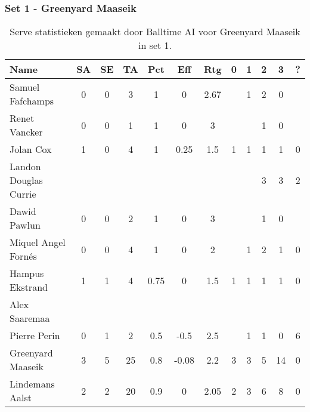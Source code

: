 \subsubsection{Set 1 - Greenyard Maaseik}
\label{sec:PL3_Greenyard1}

\begin{table}[ht!]
  \centering
  \scriptsize
  \begin{tabular}{|l|c|c|c|c|c|c|c|c|c|c|c|} \hline
    \textbf{Name} & SA & SE & TA & Pct & Eff & Rtg & 0 & 1 & 2 & 3 & ? \\ \hline
    Samuel Fafchamps & 0 & 0 & 3 & 1 & 0 & 2.67 &   & 1 & 2 & 0 &   \\
    Renet Vancker & 0 & 0 & 1 & 1 & 0 & 3 &   &   & 1 & 0 &   \\
    Jolan Cox & 1 & 0 & 4 & 1 & 0.25 & 1.5 & 1 & 1 & 1 & 1 & 0 \\
    Landon Douglas Currie &   &   &   &   &   &   &   &   & 3 & 3 & 2 \\
    Dawid Pawlun & 0 & 0 & 2 & 1 & 0 & 3 &   &   & 1 & 0 &   \\
    Miquel Angel Fornés & 0 & 0 & 4 & 1 & 0 & 2 &   & 1 & 2 & 1 & 0 \\
    Hampus Ekstrand & 1 & 1 & 4 & 0.75 & 0 & 1.5 & 1 & 1 & 1 & 1 & 0 \\
    Alex Saaremaa &   &   &   &   &   &   &   &   &   &   &   \\
    Pierre Perin & 0 & 1 & 2 & 0.5 & -0.5 & 2.5 &   & 1 & 1 & 0 & 6 \\
    Greenyard Maaseik & 3 & 5 & 25 & 0.8 & -0.08 & 2.2 & 3 & 3 & 5 & 14 & 0 \\
    Lindemans Aalst & 2 & 2 & 20 & 0.9 & 0 & 2.05 & 2 & 3 & 6 & 8 & 0 \\ \hline
  \end{tabular}
  \caption[Serve statistieken gemaakt door Balltime AI voor Greenyard Maaseik in set 1]{\label{tab:PL3ServeMaaseik1}Serve statistieken gemaakt door Balltime AI voor Greenyard Maaseik in set 1.}
\end{table}

